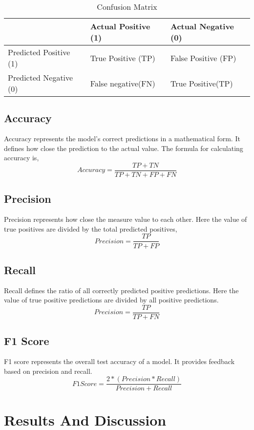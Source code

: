 \begin{table}[h!]
\centering
\begin{tabular}{|l|l|l|}
\hline
& Actual Positive (1) & Actual Negative (0)\\
\hline
Predicted Positive (1) & True Positive (TP) & False Positive (FP)  \\
\hline
Predicted Negative (0) & False negative(FN) & True Positive(TP) \\
\hline
\end{tabular}
\caption{Confusion Matrix}
\end{table}

\subsection{Accuracy}
Accuracy represents the model's correct predictions in a mathematical form. It defines how close the prediction to the actual value.
The formula for calculating accuracy is,
\begin{equation}
Accuracy = {\frac{TP+TN}{TP+TN+FP+FN}}
\end{equation}

\subsection{Precision}
Precision represents how close the measure value to each other. Here the value of true positives are divided by the total predicted positives,
\begin{equation}
Precision = {\frac{TP}{TP+FP}}
\end{equation}

\subsection{Recall}
Recall defines the ratio of all correctly predicted positive predictions. Here the value of true positive predictions are divided by all positive predictions.
\begin{equation}
Precision = {\frac{TP}{TP+FN}}
\end{equation}

\subsection{F1 Score}
F1 score represents the overall test accuracy of a model. It provides feedback based on precision and recall.
\begin{equation}
F1 Score = {\frac{2*(Precision*Recall)}{Precision+Recall}}
\end{equation}

\section{Results And Discussion}

